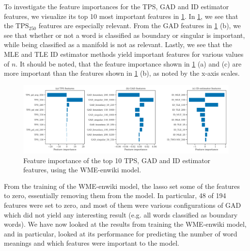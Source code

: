 To investigate the feature importances for the TPS, GAD and ID estimator features, we visualize its top 10 most important features in \cref{fig:wme-enwiki-feature-importances-tps-gad-estimated-ids}. In \cref{fig:wme-enwiki-feature-importances-tps-gad-estimated-ids}, we see that the $\text{TPS}_{250}$ features are especially relevant. From the GAD features in \cref{fig:wme-enwiki-feature-importances-tps-gad-estimated-ids} (b), we see that whether or not a word is classified as boundary or singular is important, while being classified as a manifold is not as relevant. Lastly, we see that the MLE and TLE ID estimator methods yield important features for various values of $n$. It should be noted, that the feature importance shown in \cref{fig:wme-enwiki-feature-importances-tps-gad-estimated-ids} (a) and (c) are more important than the features shown in \cref{fig:wme-enwiki-feature-importances-tps-gad-estimated-ids} (b), as noted by the x-axis scales.
\begin{figure}[H]
    \centering
    \includegraphics[width=\textwidth]{thesis/figures/wme-enwiki-top-10-feature-importances-tps-gad-estimated-ids.pdf}
    \caption{Feature importance of the top 10 TPS, GAD and ID estimator features, using the WME-enwiki model.}
    \label{fig:wme-enwiki-feature-importances-tps-gad-estimated-ids}
\end{figure}

From the training of the WME-enwiki model, the lasso set some of the features to zero, essentially removing them from the model. In particular, 48 of 194 features were set to zero, and most of them were various configurations of GAD which did not yield any interesting result (e.g. all words classified as boundary words). We have now looked at the results from training the WME-enwiki model, and in particular, looked at its performance for predicting the number of word meanings and which features were important to the model.

